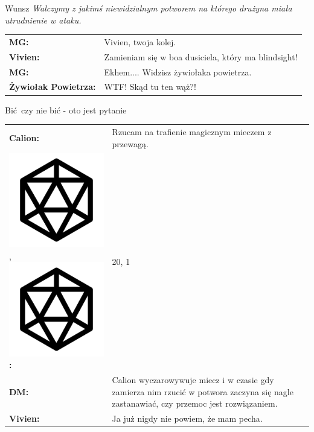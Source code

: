 \documentclass[10pt,twoside,twocolumn]{book}
\begin{document}
\begin{rpg-quotebox}{Wunsz\!}
   \textit{Walczymy z jakimś niewidzialnym potworem na którego drużyna miała utrudnienie w ataku.}\\

   \begin{tabularx}{\columnwidth}{lX}
      \textbf{MG:} & Vivien, twoja kolej.\\
      \textbf{Vivien:} & Zamieniam się w boa dusiciela, który ma blindsight!\\
      \textbf{MG:} & Ekhem.... Widzisz żywiołaka powietrza.\\
      \textbf{Żywiołak Powietrza:} & WTF! Skąd tu ten wąż?!\\
   \end{tabularx}
\end{rpg-quotebox}

\begin{rpg-quotebox}{Bić\, czy nie bić - oto jest pytanie}
   \begin{tabularx}{\columnwidth}{lX}
      \textbf{Calion:} & Rzucam na trafienie magicznym mieczem z przewagą.\\
      \includegraphics[scale=0.06]{img/d20.png},\includegraphics[scale=0.06]{img/d20.png}\textbf{:}& 20, 1\\
      \textbf{DM:} & Calion wyczarowywuje miecz i w czasie gdy zamierza nim rzucić w potwora zaczyna się nagle zastanawiać, czy przemoc jest rozwiązaniem.\\
      \textbf{Vivien:} & Ja już nigdy nie powiem, że mam pecha.\\
   \end{tabularx}
\end{rpg-quotebox}
\end{document}
